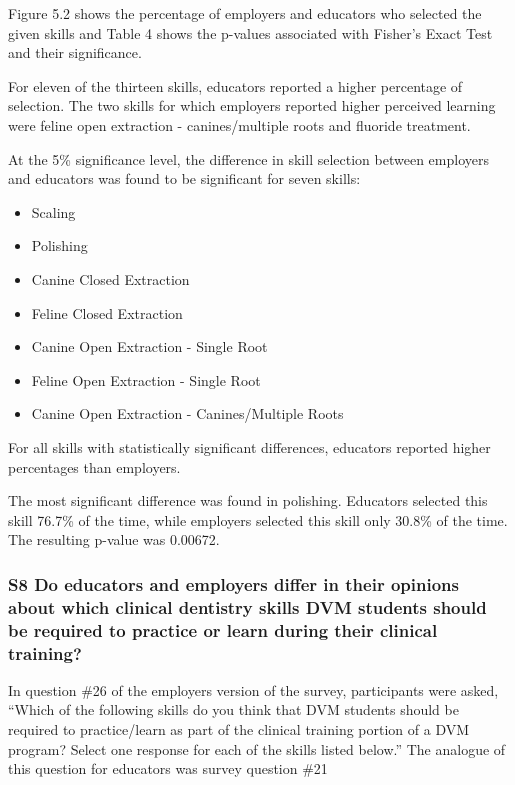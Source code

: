 \documentclass[
  11pt,
  letterpaper,
  DIV=11,
  numbers=noendperiod]{scrartcl}
\providecommand{\tightlist}{%
  \setlength{\itemsep}{0pt}\setlength{\parskip}{0pt}}\usepackage{longtable,booktabs,array}
\numberwithin{figure}{section}
\begin{document}
Figure 5.2 shows the percentage of employers and educators who selected
the given skills and Table 4 shows the p-values associated with Fisher's
Exact Test and their significance.

For eleven of the thirteen skills, educators reported a higher
percentage of selection. The two skills for which employers reported
higher perceived learning were feline open extraction - canines/multiple
roots and fluoride treatment.

At the 5\% significance level, the difference in skill selection between
employers and educators was found to be significant for seven skills:

\begin{itemize}
\tightlist
\item
  Scaling
\item
  Polishing
\item
  Canine Closed Extraction
\item
  Feline Closed Extraction
\item
  Canine Open Extraction - Single Root
\item
  Feline Open Extraction - Single Root
\item
  Canine Open Extraction - Canines/Multiple Roots
\end{itemize}

For all skills with statistically significant differences, educators
reported higher percentages than employers.

The most significant difference was found in polishing. Educators
selected this skill 76.7\% of the time, while employers selected this
skill only 30.8\% of the time. The resulting p-value was 0.00672.

\hypertarget{s8-do-educators-and-employers-differ-in-their-opinions-about-which-clinical-dentistry-skills-dvm-students-should-be-required-to-practice-or-learn-during-their-clinical-training}{%
\subsubsection{S8 Do educators and employers differ in their opinions
about which clinical dentistry skills DVM students should be required to
practice or learn during their clinical
training?}\label{s8-do-educators-and-employers-differ-in-their-opinions-about-which-clinical-dentistry-skills-dvm-students-should-be-required-to-practice-or-learn-during-their-clinical-training}}

In question \#26 of the employers version of the survey, participants
were asked, ``Which of the following skills do you think that DVM
students should be required to practice/learn as part of the clinical
training portion of a DVM program? Select one response for each of the
skills listed below.'' The analogue of this question for educators was
survey question \#21
\end{document}
